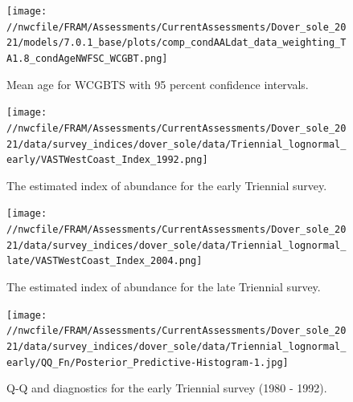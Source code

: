 \documentclass[11pt,
  english,
  a4paper,
]{article}
\begin{document}
\begin{figure}
\centering
\texttt{[image: //nwcfile/FRAM/Assessments/CurrentAssessments/Dover\_sole\_2021/models/7.0.1\_base/plots/comp\_condAALdat\_data\_weighting\_TA1.8\_condAgeNWFSC\_WCGBT.png]}
\caption{Mean age for WCGBTS with 95 percent confidence intervals.\label{fig:mean-wcgbt-age-data}}
\end{figure}

\tagmcend\tagstructend

\newpage


\begin{figure}
\centering
\texttt{[image: //nwcfile/FRAM/Assessments/CurrentAssessments/Dover\_sole\_2021/data/survey\_indices/dover\_sole/data/Triennial\_lognormal\_early/VASTWestCoast\_Index\_1992.png]}
\caption{The estimated index of abundance for the early Triennial survey.\label{fig:tri-early-index}}
\end{figure}

\tagmcend\tagstructend


\begin{figure}
\centering
\texttt{[image: //nwcfile/FRAM/Assessments/CurrentAssessments/Dover\_sole\_2021/data/survey\_indices/dover\_sole/data/Triennial\_lognormal\_late/VASTWestCoast\_Index\_2004.png]}
\caption{The estimated index of abundance for the late Triennial survey.\label{fig:tri-late-index}}
\end{figure}

\tagmcend\tagstructend

\newpage


\begin{figure}
\centering
\texttt{[image: //nwcfile/FRAM/Assessments/CurrentAssessments/Dover\_sole\_2021/data/survey\_indices/dover\_sole/data/Triennial\_lognormal\_early/QQ\_Fn/Posterior\_Predictive-Histogram-1.jpg]}
\caption{Q-Q and diagnostics for the early Triennial survey (1980 - 1992).\label{fig:tri-early-qq}}
\end{figure}

\tagmcend\tagstructend
\end{document}
